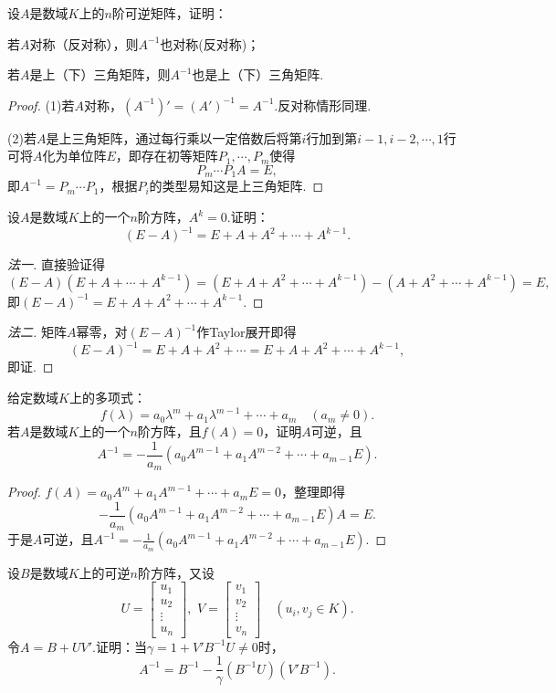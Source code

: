 \begin{prob}[18]
	设$A$是数域$K$上的$n$阶可逆矩阵，证明：
	\begin{mylist}
		\item 若$A$对称（反对称），则$A^{-1}$也对称(反对称)；
		\item 若$A$是上（下）三角矩阵，则$A^{-1}$也是上（下）三角矩阵.
	\end{mylist}
\end{prob}
\begin{proof}
	(1)若$A$对称，$(A^{-1})'=(A')^{-1}=A^{-1}$.反对称情形同理.\par
	(2)若$A$是上三角矩阵，通过每行乘以一定倍数后将第$i$行加到第$i-1,i-2,\cdots,1$行可将$A$化为单位阵$E$，即存在初等矩阵$P_1,\cdots,P_m$使得
	\[
		P_m\cdots P_1A=E,
	\]
	即$A^{-1}=P_m\cdots P_1$，根据$P_i$的类型易知这是上三角矩阵.
\end{proof}
\begin{prob}[19]
	设$A$是数域$K$上的一个$n$阶方阵，$A^k=0$.证明：
	\[
		(E-A)^{-1}=E+A+A^2+\cdots+A^{k-1}.
	\]
\end{prob}
\begin{proof}[法一]
	直接验证得
	\[
		(E-A)(E+A+\cdots+A^{k-1})=(E+A+A^2+\cdots+A^{k-1})-(A+A^2+\cdots+A^{k-1})=E,
	\]
	即$(E-A)^{-1}=E+A+A^2+\cdots+A^{k-1}$.
\end{proof}
\begin{proof}[法二]
	矩阵$A$幂零，对$(E-A)^{-1}$作Taylor展开即得
	\[
		(E-A)^{-1}=E+A+A^2+\cdots=E+A+A^2+\cdots+A^{k-1},
	\]
	即证.
\end{proof}
\begin{prob}[20]
	给定数域$K$上的多项式：
	\[
		f(\lambda)=a_0\lambda^m+a_1\lambda^{m-1}+\cdots+a_m\quad(a_m\ne0).
	\]
	若$A$是数域$K$上的一个$n$阶方阵，且$f(A)=0$，证明$A$可逆，且
	\[
		A^{-1}=-\frac{1}{a_m}(a_0A^{m-1}+a_1A^{m-2}+\cdots+a_{m-1}E).
	\]
\end{prob}
\begin{proof}
	$f(A)=a_0A^m+a_1A^{m-1}+\cdots+a_mE=0$，整理即得
	\[
		-\frac{1}{a_m}(a_0A^{m-1}+a_1A^{m-2}+\cdots+a_{m-1}E)A=E.
	\]
	于是$A$可逆，且$A^{-1}=-\frac{1}{a_m}(a_0A^{m-1}+a_1A^{m-2}+\cdots+a_{m-1}E)$.
\end{proof}
\begin{prob}[21]
	设$B$是数域$K$上的可逆$n$阶方阵，又设
	\[
		U=\begin{bmatrix}
			u_1 \\u_2\\\vdots\\u_n
		\end{bmatrix},\,\,V=\begin{bmatrix}
			v_1 \\v_2\\\vdots\\v_n
		\end{bmatrix}\quad(u_i,v_j\in K).
	\]
	令$A=B+UV'$.证明：当$\gamma=1+V'B^{-1}U\ne0$时，
	\[
		A^{-1}=B^{-1}-\frac{1}{\gamma}(B^{-1}U)(V'B^{-1}).
	\]
\end{prob}
